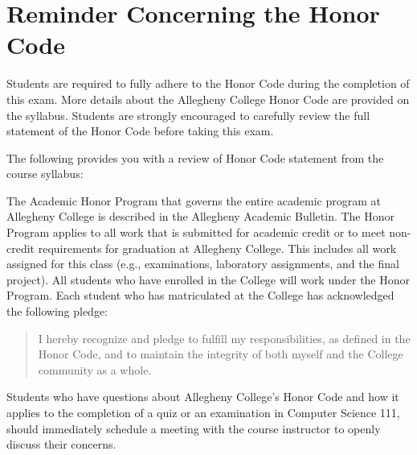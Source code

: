 \vspace*{-.15in}
\section*{Reminder Concerning the Honor Code}

\noindent Students are required to fully adhere to the Honor Code during the completion of this exam. More details about
the Allegheny College Honor Code are provided on the syllabus. Students are strongly encouraged to carefully review the
full statement of the Honor Code before taking this exam.

\noindent The following provides you with a review of Honor Code statement from the course syllabus:

The Academic Honor Program that governs the entire academic program at Allegheny College is described in the Allegheny
Academic Bulletin.  The Honor Program applies to all work that is submitted for academic credit or to meet non-credit
requirements for graduation at Allegheny College.  This includes all work assigned for this class (e.g., examinations,
laboratory assignments, and the final project).  All students who have enrolled in the College will work under the Honor
Program.  Each student who has matriculated at the College has acknowledged the following pledge:

\vspace*{-.11in}
\begin{quote}
  I hereby recognize and pledge to fulfill my responsibilities, as defined in the Honor Code, and to maintain the
  integrity of both myself and the College community as a whole.
\end{quote}
\vspace*{-.11in}

\noindent Students who have questions about Allegheny College's Honor Code and how it applies to the completion of a
quiz or an examination in Computer Science 111, should immediately schedule a meeting with the course instructor to
openly discuss their concerns.


